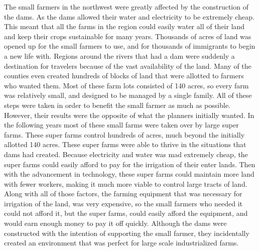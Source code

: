 \documentclass[12pt,twoside]{article}
\begin{document}
The small farmers in the northwest were greatly affected by the construction of
the dams. As the dams allowed their water and electricity to be extremely
cheap. This meant that all the farms in the region could easily water all of
their land and keep their crops sustainable for many years. Thousands of acres
of land was opened up for the small farmers to use, and for thousands of
immigrants to begin a new life with. Regions around the rivers that had a dam
were suddenly a destination for travelers because of the vast availability of
the land. Many of the counties even created hundreds of blocks of land that
were allotted to farmers who wanted them. Most of these farm lots consisted of
140 acres, so every farm was relatively small, and designed to be managed by a
single family. All of these steps were taken in order to benefit the small
farmer as much as possible. However, their results were the opposite of what
the planners initially wanted. In the following years most of these small farms
were taken over by large super farms. These super farms control hundreds of
acres, much beyond the initially allotted 140 acres. These super farms were
able to thrive in the situations that dams had created. Because electricity and
water was mad extremely cheap, the super farms could easily afford to pay for
the irrigation of their enter lands. Then with the advancement in technology,
these super farms could maintain more land with fewer workers, making it much
more viable to control large tracts of land. Along with all of those factors,
the farming equipment that was necessary for irrigation of the land, was very
expensive, so the small farmers who needed it could not afford it, but the
super farms, could easily afford the equipment, and would earn enough money to
pay it off quickly. Although the dams were constructed with the intention of
supporting the small farmer, they incidentally created an environment that was
perfect for large scale industrialized farms. 
\end{document}
